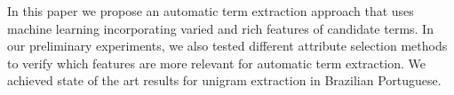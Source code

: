 In this paper we propose an automatic term extraction approach that uses machine learning incorporating varied and rich features of candidate terms. In
 our preliminary experiments, we also tested different attribute selection
 methods to verify which features are more relevant for automatic term
 extraction. We achieved state of the art results for unigram
 extraction in Brazilian Portuguese.

